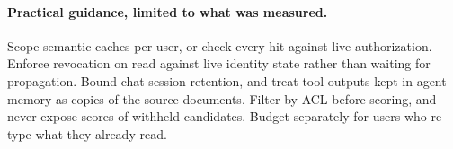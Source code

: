\paragraph{Practical guidance, limited to what was measured.}
Scope semantic caches per user, or check every hit against live authorization. Enforce revocation on
read against live identity state rather than waiting for propagation. Bound chat-session retention,
and treat tool outputs kept in agent memory as copies of the source documents. Filter by ACL before
scoring, and never expose scores of withheld candidates. Budget separately for users who re-type
what they already read.
